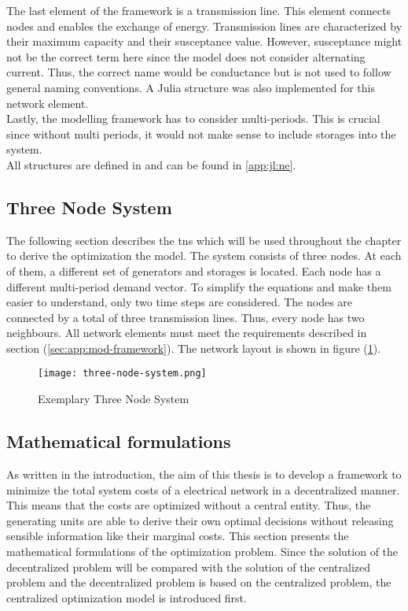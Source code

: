 The last element of the framework is a transmission line. This element connects nodes and enables the exchange of energy. Transmission lines are characterized by their maximum capacity and their susceptance value. However, susceptance might not be the correct term here since the model does not consider alternating current. Thus, the correct name would be conductance but is not used to follow general naming conventions. A Julia structure was also implemented for this network element.\\

Lastly, the modelling framework has to consider multi-periods. This is crucial since without multi periods, it would not make sense to include storages into the system.\\

All structures are defined in  and can be found in \ref{app:jl:ne}.

 
\subsection{Three Node System}
\label{sec:app:tns}

The following section describes the \gls{tns} which will be used throughout the chapter to derive the optimization the model. The system consists of three nodes. At each of them, a different set of generators and storages is located. Each node has a different multi-period demand vector. To simplify the equations and make them easier to understand, only two time steps are considered. The nodes are connected by a total of three transmission lines. Thus, every node has two neighbours. All network elements must meet the requirements described in section (\ref{sec:app:mod-framework}). The network layout is shown in figure (\ref{fig:tns}).

\begin{figure}[h]
	\centering
	\texttt{[image: three-node-system.png]}
	\caption{Exemplary Three Node System}
	\label{fig:tns}
\end{figure}


\subsection{Mathematical formulations}

As written in the introduction, the aim of this thesis is to develop a framework to minimize the total system costs of a electrical network in a decentralized manner. This means that the costs are optimized without a central entity. Thus, the generating units are able to derive their own optimal decisions without releasing sensible information like their marginal costs. This section presents the mathematical formulations of the optimization problem. Since the solution of the decentralized problem will be compared with the solution of the centralized problem and the decentralized problem is based on the centralized problem, the centralized optimization model is introduced first.

